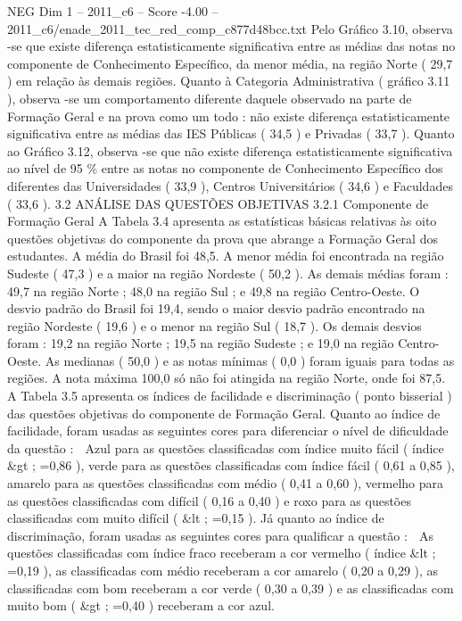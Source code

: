 \begin{textsample}{NEG Dim 1 – 2011\_c6 – Score -4.00 – 2011\_c6/enade\_2011\_tec\_red\_comp\_c877d48bcc.txt}
Pelo Gráfico 3.10, observa -se que existe diferença estatisticamente significativa entre as médias das notas no componente de Conhecimento Específico, da menor média, na região Norte ( 29,7 ) em relação às demais regiões.
Quanto à Categoria Administrativa ( gráfico 3.11 ), observa -se um comportamento diferente daquele observado na parte de Formação Geral e na prova como um todo : não existe diferença estatisticamente significativa entre as médias das IES Públicas ( 34,5 ) e Privadas ( 33,7 ).
Quanto ao Gráfico 3.12, observa -se que não existe diferença estatisticamente significativa ao nível de 95 \% entre as notas no componente de Conhecimento Específico dos diferentes das Universidades ( 33,9 ), Centros Universitários ( 34,6 ) e Faculdades ( 33,6 ). 3.2 ANÁLISE DAS QUESTÕES OBJETIVAS 3.2.1 Componente de Formação Geral A Tabela 3.4 apresenta as estatísticas básicas relativas às oito questões objetivas do componente da prova que abrange a Formação Geral dos estudantes.
A média do Brasil foi 48,5.
A menor média foi encontrada na região Sudeste ( 47,3 ) e a maior na região Nordeste ( 50,2 ).
As demais médias foram : 49,7 na região Norte ; 48,0 na região Sul ; e 49,8 na região Centro-Oeste.
O desvio padrão do Brasil foi 19,4, sendo o maior desvio padrão encontrado na região Nordeste ( 19,6 ) e o menor na região Sul ( 18,7 ).
Os demais desvios foram : 19,2 na região Norte ; 19,5 na região Sudeste ; e 19,0 na região Centro-Oeste.
As medianas ( 50,0 ) e as notas mínimas ( 0,0 ) foram iguais para todas as regiões.
A nota máxima 100,0 só não foi atingida na região Norte, onde foi 87,5.
A Tabela 3.5 apresenta os índices de facilidade e discriminação ( ponto bisserial ) das questões objetivas do componente de Formação Geral.
Quanto ao índice de facilidade, foram usadas as seguintes cores para diferenciar o nível de dificuldade da questão :  Azul para as questões classificadas com índice muito fácil ( índice \&gt ; =0,86 ), verde para as questões classificadas com índice fácil ( 0,61 a 0,85 ), amarelo para as questões classificadas com médio ( 0,41 a 0,60 ), vermelho para as questões classificadas com difícil ( 0,16 a 0,40 ) e roxo para as questões classificadas com muito difícil ( \&lt ; =0,15 ).
Já quanto ao índice de discriminação, foram usadas as seguintes cores para qualificar a questão :  As questões classificadas com índice fraco receberam a cor vermelho ( índice \&lt ; =0,19 ), as classificadas com médio receberam a cor amarelo ( 0,20 a 0,29 ), as classificadas com bom receberam a cor verde ( 0,30 a 0,39 ) e as classificadas com muito bom ( \&gt ; =0,40 ) receberam a cor azul.

\end{textsample}
